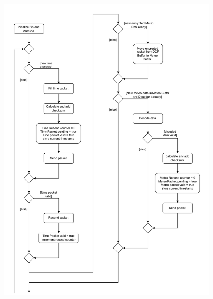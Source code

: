 \documentclass[a4paper,11pt]{article}
\begin{document}
\begin{figure}[H]
  \centering
  \includegraphics[scale=0.75, page=1]{Ablauf extern.pdf}
\end{figure}
\end{document}
